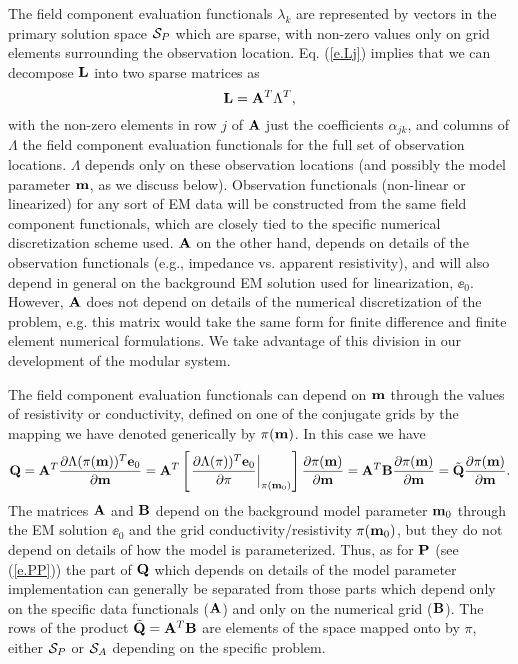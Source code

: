 The field component
evaluation functionals $\lambda_k$ are represented by
vectors in the primary solution space ${\cal S}_P$
which are sparse, with non-zero values only on grid
elements surrounding the observation location.
Eq. (\ref{e.Lj}) implies that we can decompose ${\bf L}$
into two sparse matrices as
\begin{equation}
\label{e.LL}
{\bf L} = {\bf A}^T \Lambda^T ,
\end{equation}
with the non-zero elements in row $j$
of ${\bf A}$ just the coefficients $\alpha_{jk}$,
and columns of $\Lambda$ the field component
evaluation functionals for the full set of
observation locations.
$\Lambda$ depends only
on these observation locations (and possibly the
model parameter ${\bf m}$, as we discuss below).  Observation
functionals (non-linear or linearized)
for any sort of EM data will be constructed
from the same field component functionals,
which are closely tied to the specific
numerical discretization scheme used.
${\bf A}$ on the other hand, depends on details of
the observation functionals (e.g., impedance vs.
apparent resistivity), and
will also depend in general on the
background EM solution used for linearization, $\ee_0$.  However,
${\bf A}$ does not depend on details of
the numerical discretization of the problem, e.g.
this matrix would take the same form for finite difference
and finite element numerical formulations.
We take advantage of this division in our
development of the modular system.

The field component evaluation functionals 
can depend on ${\bf m}$ through the values of resistivity or
conductivity, defined on one of the conjugate grids
by the mapping we have denoted generically by
$\pi({\bf m})$.  In this case we have
\begin{equation}
\label{e.QQ}
{\bf Q} = {\bf A}^T \frac{\partial \Lambda(\pi({\bf m}))^T{\bf e}_0}{\partial {\bf m}}
= {\bf A}^T \left[ \left . \frac{\partial \Lambda(\pi))^T{\bf e}_0}
{\partial \pi} \right|_{\pi({\bf m}_0)} \right]
\frac{\partial \pi({\bf m})}{\partial {\bf m}}
= {\bf A}^T {\bf B} \frac{\partial \pi({\bf m})}{\partial {\bf m}}
= \tilde{{\bf Q}}  \frac{\partial \pi({\bf m})}{\partial {\bf m}}.
\end{equation}
The matrices ${\bf A}$ and ${\bf B}$ depend on the 
background model parameter ${\bf m}_0$
through the EM solution $\ee_0$ and the grid
conductivity/resistivity $\pi({\bf m}_0)$, but they
do not depend on details of how the model is parameterized. 
Thus, as for ${\bf P}$  (see (\ref{e.PP}))
the part of ${\bf Q}$ which depends on details of the
model parameter implementation can generally be separated from those parts
which depend only on the specific data functionals 
(${\bf A}$) and only on the numerical grid (${\bf B}$).
The rows of the product $\tilde{{\bf Q}}= {\bf A}^T{\bf B}$ 
are elements of the space mapped onto by $\pi$, either
${\cal S}_P$ or ${\cal S}_A$ depending on the specific problem.

